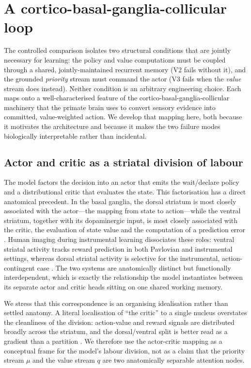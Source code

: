 \section{A cortico-basal-ganglia-collicular loop}

The controlled comparison isolates two structural conditions that are jointly necessary for learning: the policy and value computations must be coupled through a shared, jointly-maintained recurrent memory (V2 fails without it), and the grounded \emph{priority} stream must command the actor (V3 fails when the \emph{value} stream does instead). Neither condition is an arbitrary engineering choice. Each maps onto a well-characterised feature of the cortico-basal-ganglia-collicular machinery that the primate brain uses to convert sensory evidence into committed, value-weighted action. We develop that mapping here, both because it motivates the architecture and because it makes the two failure modes biologically interpretable rather than incidental.

\subsection{Actor and critic as a striatal division of labour}

The model factors the decision into an actor that emits the wait/declare policy and a distributional critic that evaluates the state. This factorisation has a direct anatomical precedent. In the basal ganglia, the dorsal striatum is most closely associated with the actor---the mapping from state to action---while the ventral striatum, together with its dopaminergic input, is most closely associated with the critic, the evaluation of state value and the computation of a prediction error \citep{odoherty2004dissociable,maia2009reinforcement}. Human imaging during instrumental learning dissociates these roles: ventral striatal activity tracks reward prediction in both Pavlovian and instrumental settings, whereas dorsal striatal activity is selective for the instrumental, action-contingent case \citep{odoherty2004dissociable}. The two systems are anatomically distinct but functionally interdependent, which is exactly the relationship the model instantiates between its separate actor and critic heads sitting on one shared working memory.

We stress that this correspondence is an organising idealisation rather than settled anatomy. A literal localisation of ``the critic'' to a single nucleus overstates the cleanliness of the division: action-value and reward signals are distributed broadly across the striatum, and the dorsal/ventral split is better read as a gradient than a partition \citep{maia2009reinforcement}. We therefore use the actor-critic mapping as a conceptual frame for the model's labour division, not as a claim that the priority stream $\mu$ and the value stream $q$ are two anatomically separable attention nodes.

